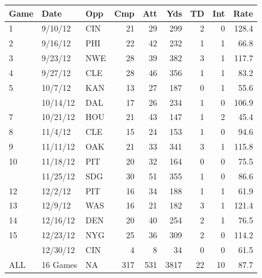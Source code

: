 \documentclass[
  11pt,
]{book}
\theoremstyle{definition}
\theoremstyle{definition}
\theoremstyle{definition}
\theoremstyle{definition}
\theoremstyle{remark}
\begin{document}
\begin{tabular}{lllrrrrrr}
\toprule
Game & Date & Opp & Cmp & Att & Yds & TD & Int & Rate\\
\midrule
1 & 9/10/12 & CIN & 21 & 29 & 299 & 2 & 0 & 128.4\\
2 & 9/16/12 & PHI & 22 & 42 & 232 & 1 & 1 & 66.8\\
3 & 9/23/12 & NWE & 28 & 39 & 382 & 3 & 1 & 117.7\\
4 & 9/27/12 & CLE & 28 & 46 & 356 & 1 & 1 & 83.2\\
5 & 10/7/12 & KAN & 13 & 27 & 187 & 0 & 1 & 55.6\\
\addlinespace
6 & 10/14/12 & DAL & 17 & 26 & 234 & 1 & 0 & 106.9\\
7 & 10/21/12 & HOU & 21 & 43 & 147 & 1 & 2 & 45.4\\
8 & 11/4/12 & CLE & 15 & 24 & 153 & 1 & 0 & 94.6\\
9 & 11/11/12 & OAK & 21 & 33 & 341 & 3 & 1 & 115.8\\
10 & 11/18/12 & PIT & 20 & 32 & 164 & 0 & 0 & 75.5\\
\addlinespace
11 & 11/25/12 & SDG & 30 & 51 & 355 & 1 & 0 & 86.6\\
12 & 12/2/12 & PIT & 16 & 34 & 188 & 1 & 1 & 61.9\\
13 & 12/9/12 & WAS & 16 & 21 & 182 & 3 & 1 & 121.4\\
14 & 12/16/12 & DEN & 20 & 40 & 254 & 2 & 1 & 76.5\\
15 & 12/23/12 & NYG & 25 & 36 & 309 & 2 & 0 & 114.2\\
\addlinespace
16 & 12/30/12 & CIN & 4 & 8 & 34 & 0 & 0 & 61.5\\
ALL & 16 Games & NA & 317 & 531 & 3817 & 22 & 10 & 87.7\\
\bottomrule
\end{tabular}

\newpage
\end{document}
